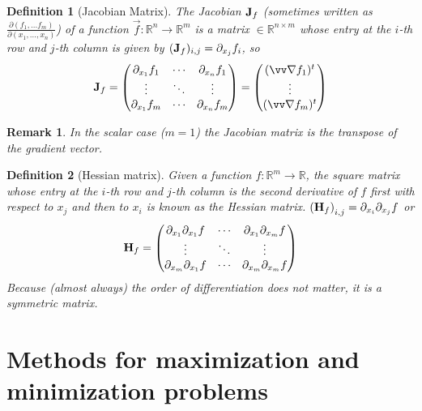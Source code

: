 \documentclass[twocolumn, margin=normal]{tex/hsrzf}
\theoremstyle{fuvarzf}
\newtheorem{definition}{Definition}
\newtheorem{remark}{Remark}
\begin{document}
\begin{definition}[Jacobian Matrix]
  The \emph{Jacobian} \(\bm{\mathrm{J}}_f\) (sometimes written as
  \(\frac{\partial(f_1,\ldots f_m)}{\partial(x_1,\ldots,x_n)}\)) of a function
  \(\vec{f}: \mathbb{R}^n \to \mathbb{R}^m\) is a matrix
  \(\in\mathbb{R}^{n\times m}\) whose entry at the \(i\)-th row and \(j\)-th
  column is given by \((\bm{\mathrm{J}}_f)_{i,j} = \partial_{x_j} f_i\), so
  \[
    \mx{J}_f = \begin{pmatrix}
      \partial_{x_1} f_1 & \cdots & \partial_{x_n} f_1 \\
      \vdots & \ddots & \vdots \\
      \partial_{x_1} f_m & \cdots & \partial_{x_n} f_m \\
    \end{pmatrix}
    = \begin{pmatrix}
      (\grad f_1)^t \\
      \vdots \\
      (\grad f_m)^t \\
    \end{pmatrix}
  \]
\end{definition}

\begin{remark}
  In the scalar case (\(m = 1\)) the Jacobian matrix is the transpose of the
  gradient vector.
\end{remark}

\begin{definition}[Hessian matrix]
  Given a function \(f: \mathbb{R}^m \to \mathbb{R}\), the square matrix whose
  entry at the \(i\)-th row and \(j\)-th column is the second derivative of
  \(f\) first with respect to \(x_j\) and then to \(x_i\) is known as the
  \emph{Hessian} matrix.
  \(
    \left(\bm{\mathrm{H}}_f\right)_{i,j} = \partial_{x_i}\partial_{x_j} f
  \)
  or
  \[
    \bm{\mathrm{H}}_f = \begin{pmatrix}
      \partial_{x_1}\partial_{x_1} f & \cdots & \partial_{x_1}\partial_{x_m} f \\
      \vdots & \ddots & \vdots \\
      \partial_{x_m}\partial_{x_1} f & \cdots & \partial_{x_m}\partial_{x_m} f \\
    \end{pmatrix}
  \]
  Because (almost always) the order of differentiation
  does not matter, it is a symmetric matrix.
\end{definition}


\section{Methods for maximization and minimization problems}
\end{document}
